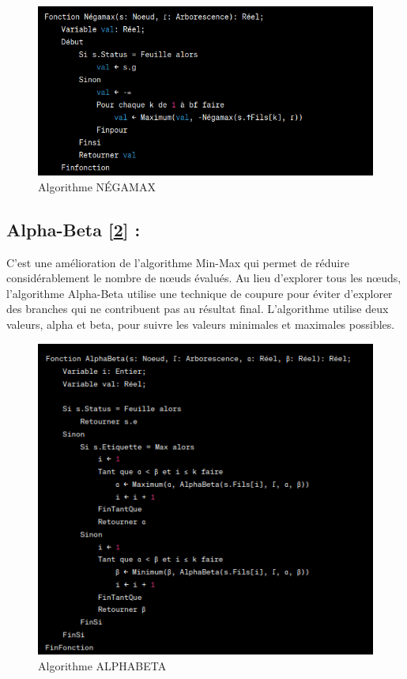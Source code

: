 \documentclass[12pt]{article}
\begin{document}
	 \begin{figure}[H]
		\centering
		\includegraphics[scale=0.55]{img/negamax.png}
		\caption{Algorithme NÉGAMAX }
		\label{Algorithme NégaMINIMAX}
	\end{figure}
	
	
	
	
	\subsection{Alpha-Beta [\ref{Algorithme ALPHABETA}] :} C'est une amélioration de l'algorithme Min-Max qui permet de réduire considérablement le nombre de nœuds évalués. Au lieu d'explorer tous les nœuds, l'algorithme Alpha-Beta utilise une technique de coupure pour éviter d'explorer des branches qui ne contribuent pas au résultat final. L'algorithme utilise deux valeurs, alpha et beta, pour suivre les valeurs minimales et maximales possibles.
	
	   
	\begin{figure}[H]
		\centering
		\includegraphics[scale=0.7]{img/alphabeta}
		\caption{Algorithme ALPHABETA }
		\label{Algorithme ALPHABETA}
	\end{figure}
	
\end{document}

